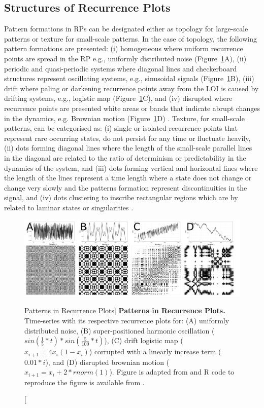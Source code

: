 \subsection{Structures of Recurrence Plots}
Pattern formations in RPs can be designated either 
as topology for large-scale patterns or texture for small-scale patterns.
In the case of topology, the following pattern formations are presented:
(i) homogeneous where uniform recurrence points are spread in the RP e.g., 
uniformly distributed noise (Figure~\ref{fig:rp2}A), 
(ii) periodic and quasi-periodic systems where diagonal lines and 
checkerboard structures represent oscillating systems, e.g., sinusoidal 
signals (Figure~\ref{fig:rp2}B), 
(iii) drift where paling or darkening recurrence points away from 
the LOI is caused by drifting systems, 
e.g., logistic map (Figure~\ref{fig:rp2}C), and
(iv) disrupted where recurrence points are presented white areas or 
bands that indicate abrupt changes in the dynamics, e.g. Brownian motion 
(Figure~\ref{fig:rp2}D) \citep{eckmann1987, marwan2015}.
Texture, for small-scale patterns, can be categorised as:
(i) single or isolated recurrence points that represent rare occurring 
states, do not persist for any time or fluctuate heavily,
(ii) dots forming diagonal lines where the length of the small-scale parallel 
lines in the diagonal are related to the ratio of determinism or 
predictability in the dynamics of the system, and
(iii) dots forming vertical and horizontal lines where the length of the 
lines represent a time length where a state does not change or change very 
slowly and the patterns formation represent discontinuities in the signal, and
(iv) dots clustering to inscribe rectangular regions which are by related 
to laminar states or singularities \citep{marwan2015}.

\begin{figure}
  \centering
    \includegraphics[width=1.0\textwidth]{rpsp}
    \caption
	[Patterns in Recurrence Plots]{
	{\bf Patterns in Recurrence Plots.} 
	Time-series with its respective recurrence plots for:
	(A) uniformly distributed noise,
	(B) super-positioned harmonic oscillation 
	($sin( \frac{1}{5}*t) * sin( \frac{5}{100}*t) $),
	(C) drift logistic map ($x_{i+1} = 4 x_i (1- x_i) $) corrupted 
	with a linearly increase term ($0.01*i$), and
	(D) disrupted brownian motion  ($x_{i+1} = x_i + 2*rnorm(1) $).
	Figure is adapted from \cite{marwan2015} and R code to reproduce 
	the figure is available from \cite{hwum2018}.
	}
    \label{fig:rp2}
\end{figure}

